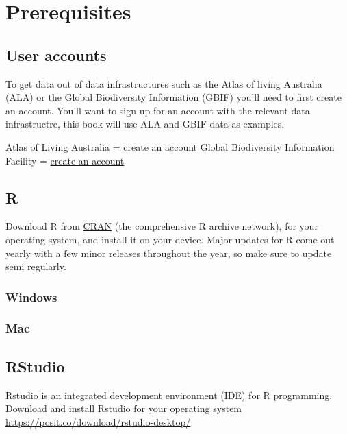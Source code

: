 \documentclass[
  letterpaper,
  DIV=11,
  numbers=noendperiod,
  oneside]{scrreprt}
\begin{document}
\hypertarget{prerequisites}{%
\section{Prerequisites}\label{prerequisites}}

\hypertarget{user-accounts}{%
\subsection{User accounts}\label{user-accounts}}

To get data out of data infrastructures such as the Atlas of living
Australia (ALA) or the Global Biodiversity Information (GBIF) you'll
need to first create an account. You'll want to sign up for an account
with the relevant data infrastructre, this book will use ALA and GBIF
data as examples.

Atlas of Living Australia =
\href{https://auth.ala.org.au/userdetails/registration/createAccount}{create
an account} Global Biodiversity Information Facility =
\href{https://www.gbif.org/user/profile}{create an account}

\hypertarget{r}{%
\subsection{R}\label{r}}

Download R from \href{https://cloud.r-project.org/}{CRAN} (the
comprehensive R archive network), for your operating system, and install
it on your device. Major updates for R come out yearly with a few minor
releases throughout the year, so make sure to update semi regularly.

\hypertarget{windows}{%
\subsubsection*{Windows}\label{windows}}

\hypertarget{mac}{%
\subsubsection*{Mac}\label{mac}}

\hypertarget{rstudio}{%
\subsection{RStudio}\label{rstudio}}

Rstudio is an integrated development environment (IDE) for R
programming. Download and install Rstudio for your operating system
\url{https://posit.co/download/rstudio-desktop/}
\end{document}
